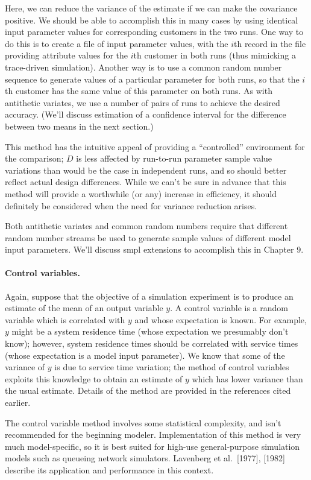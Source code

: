 Here, we can reduce the variance of the estimate if we can make the covariance
positive. We should be able to accomplish this in many cases by using identical
input parameter values for corresponding customers in the two runs. One way to
do this is to create a file of input parameter values, with the $i$th record in
the file providing attribute values for the $i$th customer in both runs (thus
mimicking a trace-driven simulation). Another way is to use a common random
number sequence to generate values of a particular parameter for both runs, so
that the $i$th customer has the same value of this parameter on both runs. As
with antithetic variates, we use a number of pairs of runs to achieve the
desired accuracy. (We'll discuss estimation of a confidence interval for the
difference between two means in the next section.)

This method has the intuitive appeal of providing a ``controlled''
environment for the comparison; $D$ is less affected by run-to-run parameter
sample value variations than would be the case in independent runs, and so
should better reflect actual design differences. While we can't be sure in
advance that this method will provide a worthwhile (or any) increase in
efficiency, it should definitely be considered when the need for variance
reduction arises.

Both antithetic variates and common random numbers require that different
random number streams be used to generate sample values of different model
input parameters. We'll discuss smpl extensions to accomplish this in
Chapter 9.

\paragraph{Control variables.}
Again, suppose that the objective of a simulation experiment is to produce an
estimate of the mean of an output variable $y$. A control variable is a random
variable which is correlated with $y$ and whose expectation is known. For
example, $y$ might be a system residence time (whose expectation we presumably
don't know); however, system residence times should be correlated with service
times (whose expectation is a model input parameter). We know that some of the
variance of $y$ is due to service time variation; the method of control
variables exploits this knowledge to obtain an estimate of $y$ which has lower
variance than the usual estimate. Details of the method are provided in the
references cited earlier.

The control variable method involves some statistical complexity, and isn't
recommended for the beginning modeler. Implementation of this method is very
much model-specific, so it is best suited for high-use general-purpose
simulation models such as queueing network simulators. Lavenberg et al.\ [1977],
[1982] describe its application and performance in this context.

